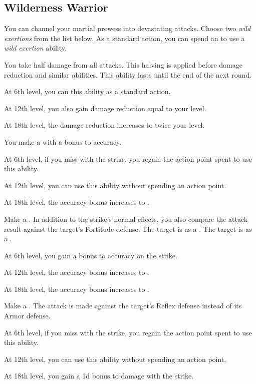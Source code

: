     \subsection{Wilderness Warrior}
        You can channel your martial prowess into devastating attacks.
        Choose two \textit{wild exertions} from the list below.
        As a standard action, you can spend an  to use a \textit{wild exertion} ability.
        {
             You take half damage from all attacks.
            This halving is applied before damage reduction and similar abilities.
            This ability lasts until the end of the next round.
            \par At 6th level, you can  this ability as a standard action.
            \par At 12th level, you also gain damage reduction equal to your level.
            \par At 18th level, the damage reduction increases to twice your level.

             You make a  with a  bonus to accuracy.
            \par At 6th level, if you miss with the strike, you regain the action point spent to use this ability.
            \par At 12th level, you can use this ability without spending an action point.
            \par At 18th level, the accuracy bonus increases to .

             Make a .
            In addition to the strike's normal effects, you also compare the attack result against the target's Fortitude defense.
             The target is \sickened as a .
             The target is \nauseated as a .
            \par At 6th level, you gain a  bonus to accuracy on the strike.
            \par At 12th level, the accuracy bonus increases to .
            \par At 18th level, the accuracy bonus increases to .

             Make a .
            The attack is made against the target's Reflex defense instead of its Armor defense.
            \par At 6th level, if you miss with the strike, you regain the action point spent to use this ability.
            \par At 12th level, you can use this ability without spending an action point.
            \par At 18th level, you gain a \plus1d bonus to damage with the strike.

}
